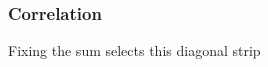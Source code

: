 \documentclass[handout]{beamer}
\begin{document}


   \begin{frame}
   \frametitle{Correlation}
   \begin{center}
   \end{center}
   Fixing the sum selects this diagonal strip
   \end{frame}


   \begin{frame} 

   \end{frame}

   
\end{document}
